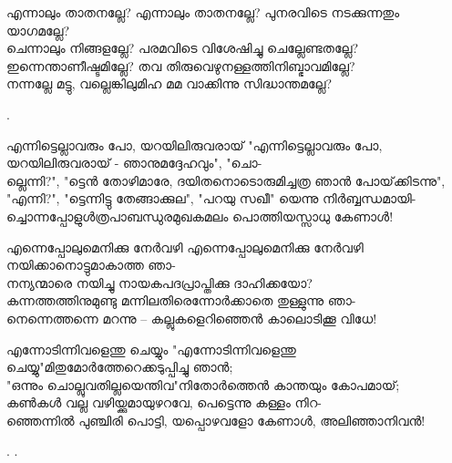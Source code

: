 \begin{enumerate}



\begin{slokam}{\VSr}{\KKT}{എന്നാലും താതനല്ലേ?}
എന്നാലും താതനല്ലേ? പുനരവിടെ നടക്കുന്നതും യാഗമല്ലേ?\\
ചെന്നാലും നിങ്ങളല്ലേ? പരമവിടെ വിശേഷിച്ചു ചെല്ലേണ്ടതല്ലേ?\\
ഇന്നെന്താണീഷ്ടമില്ലേ? തവ തിരുവെഴുനള്ളത്തിനിബ്ഭാവമില്ലേ?\\
നന്നല്ലേ മട്ടു, വല്ലെങ്കിലുമിഹ മമ വാക്കിന്നു സിദ്ധാന്തമല്ലേ?
\end{slokam}


.

\begin{slokam}{\VSr}{\VKG}{എന്നിട്ടെല്ലാവരും പോ, യറയിലിരുവരായ്‌}
"എന്നിട്ടെല്ലാവരും പോ, യറയിലിരുവരായ്‌ - ഞാനുമദ്ദേഹവും", "ചൊ-\\
ല്ലെന്നി?", "ട്ടെൻ തോഴിമാരേ, ദയിതനൊടൊരുമിച്ചത്ര ഞാൻ പോയ്‌ക്കിടന്നു",\\
"എന്നി?", "ട്ടെന്നിട്ടു തേങ്ങാക്കുല", "പറയു സഖീ" യെന്നു നിർബ്ബന്ധമായി-\\
ച്ചൊന്നപ്പോളുള്‍ത്രപാബന്ധുരമുഖകമലം പൊത്തിയസ്സാധു കേണാള്‍!
\end{slokam}


\begin{slokam}{\VSv}{\CKP}{എന്നെപ്പോലുമെനിക്കു നേർവഴി}
എന്നെപ്പോലുമെനിക്കു നേർവഴി നയിക്കാനൊട്ടുമാകാത്ത ഞാ-\\
നന്യന്മാരെ നയിച്ചു നായകപദപ്രാപ്തിക്കു ദാഹിക്കയോ?\\
കന്നത്തത്തിനുമുണ്ടു മന്നിലതിരെന്നോർക്കാതെ തുള്ളുന്നു ഞാ-\\
നെന്നെത്തന്നെ മറന്നു -- കല്ലുകളെറിഞ്ഞെൻ കാലൊടിക്കൂ വിധേ!
\end{slokam}



\begin{slokam}{\VSv}{\UN}{എന്നോടിന്നിവളെന്തു ചെയ്യും}
  "എന്നോടിന്നിവളെന്തു ചെയ്യു"മിതുമോർത്തേറെക്കടുപ്പിച്ചു ഞാൻ; \\
  "ഒന്നും ചൊല്ലുവതില്ലയെന്തിവ"നിതോർത്തെൻ കാന്തയും കോപമായ്;\\
  കൺകൾ വല്ല വഴിയ്ക്കുമായുഴറവേ, പെട്ടെന്നു   കള്ളം നിറ- \\
  ഞ്ഞെന്നിൽ പുഞ്ചിരി പൊട്ടി, യപ്പൊഴവളോ കേണാൾ, അലിഞ്ഞാനിവൻ!
\end{slokam}
  

. .



\end{enumerate}
